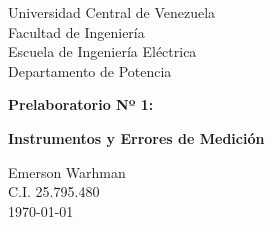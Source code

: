\begin{titlepage}
    \centering
    \Large
    Universidad Central de Venezuela\\
    Facultad de Ingeniería\\
    Escuela de Ingeniería Eléctrica\\
    Departamento de Potencia
    \vspace*{8cm}

    \Huge
    \textbf{Prelaboratorio Nº 1:}

    \textbf{Instrumentos y Errores de Medición}
    \vfill


    \Large

    Emerson Warhman \\
    C.I. 25.795.480 \\
    \today

\end{titlepage}
